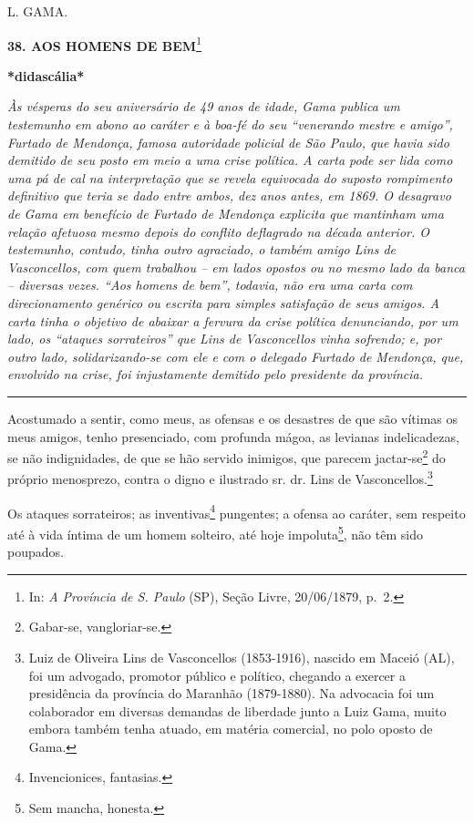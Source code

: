 L. GAMA.

\textbf{38. AOS HOMENS DE BEM}\footnote{In: \emph{A Província de S.
  Paulo} (SP), Seção Livre, 20/06/1879, p.~2.}

\textbf{*didascália*}

\emph{Às vésperas do seu aniversário de 49 anos de idade, Gama publica
um testemunho em abono ao caráter e à boa-fé do seu ``venerando mestre e
amigo'', Furtado de Mendonça, famosa autoridade policial de São Paulo,
que havia sido demitido de seu posto em meio a uma crise política. A
carta pode ser lida como uma pá de cal na interpretação que se revela
equivocada do suposto rompimento definitivo que teria se dado entre
ambos, dez anos antes, em 1869. O desagravo de Gama em benefício de
Furtado de Mendonça explicita que mantinham uma relação afetuosa mesmo
depois do conflito deflagrado na década anterior. O testemunho, contudo,
tinha outro agraciado, o também amigo Lins de Vasconcellos, com quem
trabalhou -- em lados opostos ou no mesmo lado da banca -- diversas
vezes. ``Aos homens de bem'', todavia, não era uma carta com
direcionamento genérico ou escrita para simples satisfação de seus
amigos. A carta tinha o objetivo de abaixar a fervura da crise política
denunciando, por um lado, os ``ataques sorrateiros'' que Lins de
Vasconcellos vinha sofrendo; e, por outro lado, solidarizando-se com ele
e com o delegado Furtado de Mendonça, que, envolvido na crise, foi
injustamente demitido pelo presidente da província. }

\begin{center}\rule{0.5\linewidth}{\linethickness}\end{center}

Acostumado a sentir, como meus, as ofensas e os desastres de que são
vítimas os meus amigos, tenho presenciado, com profunda mágoa, as
levianas indelicadezas, se não indignidades, de que se hão servido
inimigos, que parecem jactar-se\footnote{Gabar-se, vangloriar-se.} do
próprio menosprezo, contra o digno e ilustrado sr. dr. Lins de
Vasconcellos.\footnote{Luiz de Oliveira Lins de Vasconcellos
  (1853-1916), nascido em Maceió (AL), foi um advogado, promotor público
  e político, chegando a exercer a presidência da província do Maranhão
  (1879-1880). Na advocacia foi um colaborador em diversas demandas de
  liberdade junto a Luiz Gama, muito embora também tenha atuado, em
  matéria comercial, no polo oposto de Gama.}

Os ataques sorrateiros; as inventivas\footnote{Invencionices, fantasias.}
pungentes; a ofensa ao caráter, sem respeito até à vida íntima de um
homem solteiro, até hoje impoluta\footnote{Sem mancha, honesta.}, não
têm sido poupados.

